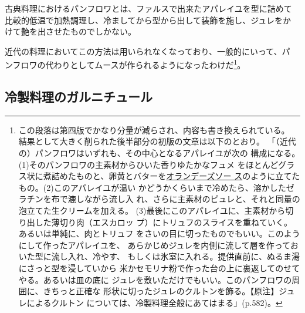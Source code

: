 

古典料理におけるパンフロワとは、ファルスで出来たアパレイユを型に詰めて
比較的低温で加熱調理し、冷ましてから型から出して装飾を施し、ジュレをか
けて艶を出させたものでしかない。

近代の料理においてこの方法は用いられなくなっており、一般的にいって、パ
ンフロワの代わりとしてムースが作られるようになったわけだ\footnote{この段落は第四版でかなり分量が減らされ、内容も書き換えられている。
  結果として大きく削られた後半部分の初版の文章は以下のとおり。
  「（近代の）パンフロワはいずれも、その中心となるアパレイユが次の
  構成になる。(1)そのパンフロワの主素材からひいた香りゆたかなフュメ
  をほとんどグラス状に煮詰めたものと、卵黄とバターを\protect\hyperlink{sauce-hollandaise}{オランデーズソー
  ス}のように立てたもの。(2)このアパレイユが温い
  かどうかくらいまで冷めたら、溶かしたゼラチンを布で漉しながら流し入
  れ、さらに主素材のピュレと、それと同量の泡立てた生クリームを加える。
  (3)最後にこのアパレイユに、主素材から切り出した薄切り肉（エスカロッ
  プ）にトリュフのスライスを重ねていく。あるいは単純に、肉とトリュフ
  をさいの目に切ったものでもいい。このようにして作ったアパレイユを、
  あらかじめジュレを内側に流して層を作っておいた型に流し入れ、冷やす、
  もしくは氷室に入れる。提供直前に、ぬるま湯にさっと型を浸していから
  米かセモリナ粉で作った台の上に裏返してのせてやる。あるいは皿の底に
  ジュレを敷いただけでもいい。このパンフロワの周囲に、きちっと正確な
  形状に切ったジュレのクルトンを飾る。【原注】ジュレによるクルトン
  については、冷製料理全般にあてはまる」(p.582)。}。

\hypertarget{garnitures-de-mets-froids}{%
\subsection{冷製料理のガルニチュール}\label{garnitures-de-mets-froids}}


